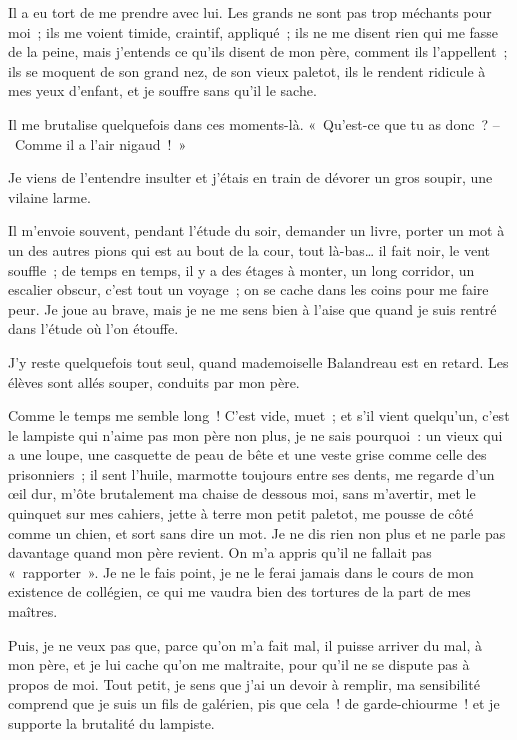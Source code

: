 \documentclass[french,twoside]{book} %
\begin{document}
Il a eu tort de me prendre avec lui. Les grands ne sont pas trop méchants pour moi ; ils me voient timide, craintif, appliqué ; ils ne me disent rien qui me fasse de la peine, mais j’entends ce qu’ils disent de mon père, comment ils l’appellent ; ils se moquent de son grand nez, de son vieux paletot, ils le rendent ridicule à mes yeux d’enfant, et je souffre sans qu’il le sache.\par
Il me brutalise quelquefois dans ces moments-là. « Qu’est-ce que tu as donc ? – Comme il a l’air nigaud ! »\par
Je viens de l’entendre insulter et j’étais en train de dévorer un gros soupir, une vilaine larme.\par
Il m’envoie souvent, pendant l’étude du soir, demander un livre, porter un mot à un des autres pions qui est au bout de la cour, tout là-bas… il fait noir, le vent souffle ; de temps en temps, il y a des étages à monter, un long corridor, un escalier obscur, c’est tout un voyage ; on se cache dans les coins pour me faire peur. Je joue au brave, mais je ne me sens bien à l’aise que quand je suis rentré dans l’étude où l’on étouffe.\par
J’y reste quelquefois tout seul, quand mademoiselle Balandreau est en retard. Les élèves sont allés souper, conduits par mon père.\par
\bigbreak
\noindent Comme le temps me semble long ! C’est vide, muet ; et s’il vient quelqu’un, c’est le lampiste qui n’aime pas mon père non plus, je ne sais pourquoi : un vieux qui a une loupe, une casquette de peau de bête et une veste grise comme celle des prisonniers ; il sent l’huile, marmotte toujours entre ses dents, me regarde d’un œil dur, m’ôte brutalement ma chaise de dessous moi, sans m’avertir, met le quinquet sur mes cahiers, jette à terre mon petit paletot, me pousse de côté comme un chien, et sort sans dire un mot. Je ne dis rien non plus et ne parle pas davantage quand mon père revient. On m’a appris qu’il ne fallait pas « rapporter ». Je ne le fais point, je ne le ferai jamais dans le cours de mon existence de collégien, ce qui me vaudra bien des tortures de la part de mes maîtres.\par
Puis, je ne veux pas que, parce qu’on m’a fait mal, il puisse arriver du mal, à mon père, et je lui cache qu’on me maltraite, pour qu’il ne se dispute pas à propos de moi. Tout petit, je sens que j’ai un devoir à remplir, ma sensibilité comprend que je suis un fils de galérien, pis que cela ! de garde-chiourme ! et je supporte la brutalité du lampiste.\par
\end{document}
